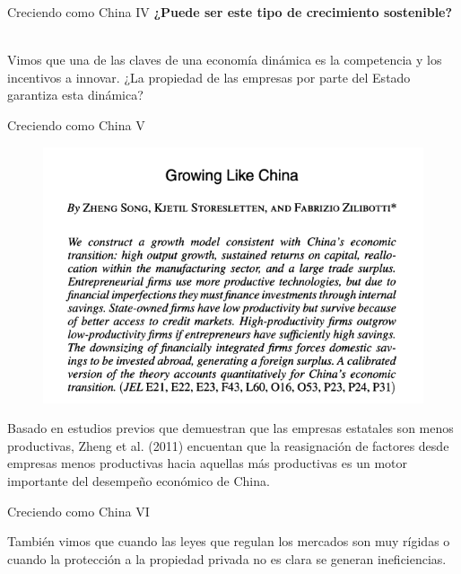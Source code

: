 \documentclass{beamer}
\let\tempone\itemize
\let\temptwo\enditemize
\renewenvironment{itemize}{\tempone\addtolength{\itemsep}{0.5\baselineskip}}{\temptwo}
\begin{document}
	\begin{frame}{Creciendo como China IV}
		\textbf{¿Puede ser este tipo de crecimiento sostenible?} \\~\\
		\pause
		\begin{itemize}
			\item Vimos que una de las claves de una economía dinámica es la competencia y los incentivos a innovar. ¿La propiedad de las empresas por parte del Estado garantiza esta dinámica?
		\end{itemize}
	\end{frame}

	\begin{frame}{Creciendo como China V}
		\begin{figure}
			\centering
			\includegraphics[width=.6\linewidth, keepaspectratio]{growing_like_china}
		\end{figure}
		\begin{itemize}
			\item Basado en estudios previos que demuestran que las empresas estatales son menos productivas, Zheng et al. (2011) encuentan que la reasignación de factores desde empresas menos productivas hacia aquellas más productivas es un motor importante del desempeño económico de China.
		\end{itemize}
	\end{frame}

	\begin{frame}{Creciendo como China VI}
		\begin{itemize}
			\item También vimos que cuando las leyes que regulan los mercados son muy rígidas o cuando la protección a la propiedad privada no es clara se generan ineficiencias.
		\end{itemize}
	\end{frame}
\end{document}
